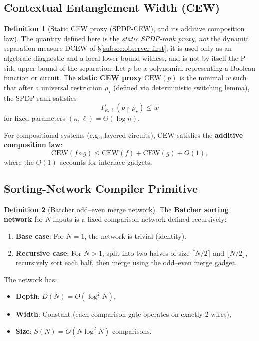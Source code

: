 \documentclass[12pt]{article}
\theoremstyle{definition}
\newtheorem{definition}{Definition}
\theoremstyle{definition}
\theoremstyle{remark}
\theoremstyle{remark}
\begin{document}
\subsection{Contextual Entanglement Width (CEW)}

\begin{definition}[Static CEW proxy (SPDP-CEW), and its additive composition law]\label{def:cew-formal}
The quantity defined here is the \emph{static SPDP-rank proxy}, \emph{not} the dynamic separation measure $\mathrm{DCEW}$ of \S\ref{subsec:observer-first}; it is used only as an algebraic diagnostic and a local lower-bound witness, and is not by itself the P-side upper bound of the separation.  Let $p$ be a polynomial representing a Boolean function or circuit. The \textbf{static CEW proxy} $\mathrm{CEW}(p)$ is the minimal $w$ such that after a universal restriction $\rho_\star$ (defined via deterministic switching lemma), the SPDP rank satisfies
\[
\Gamma_{\kappa,\ell}(p \!\upharpoonright\! \rho_\star) \leq w
\]
for fixed parameters $(\kappa,\ell) = \Theta(\log n)$.

For compositional systems (e.g., layered circuits), CEW satisfies the \textbf{additive composition law}:
\[
\mathrm{CEW}(f \circ g) \leq \mathrm{CEW}(f) + \mathrm{CEW}(g) + O(1),
\]
where the $O(1)$ accounts for interface gadgets.
\end{definition}

\subsection{Sorting-Network Compiler Primitive}

\begin{definition}[Batcher odd--even merge network]\label{def:batcher-network}
The \textbf{Batcher sorting network} for $N$ inputs is a fixed comparison network defined recursively:
\begin{enumerate}
\item \textbf{Base case}: For $N = 1$, the network is trivial (identity).
\item \textbf{Recursive case}: For $N > 1$, split into two halves of size $\lceil N/2 \rceil$ and $\lfloor N/2 \rfloor$, recursively sort each half, then merge using the odd--even merge gadget.
\end{enumerate}
The network has:
\begin{itemize}
\item \textbf{Depth}: $D(N) = O(\log^2 N)$,
\item \textbf{Width}: Constant (each comparison gate operates on exactly 2 wires),
\item \textbf{Size}: $S(N) = O(N \log^2 N)$ comparisons.
\end{itemize}
\end{definition}
\end{document}
